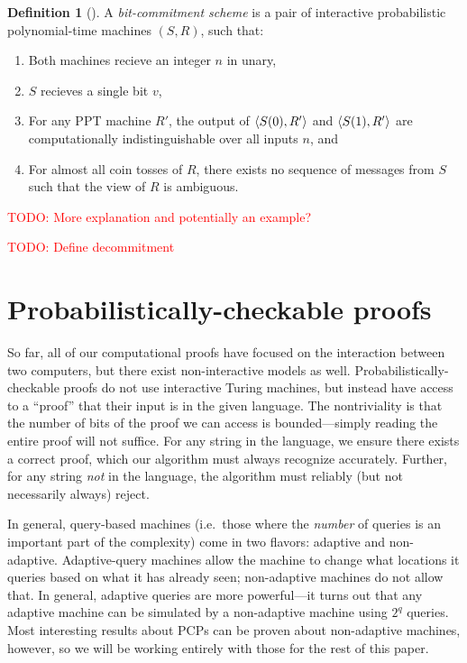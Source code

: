 \documentclass[english,12pt]{reedthesis}
\theoremstyle{plain}
\theoremstyle{definition}
\newtheorem{defn}[defn]{Definition}
\theoremstyle{remark}
\DeclarePairedDelimiter{\ang}{\langle}{\rangle}
\newcommand{\TODO}[1]{\textcolor{red}{TODO: #1}}
\begin{document}
\begin{defn}[{\cite[Def.\ 4.4.1]{Go01}}]\label{def:commitment-scheme}
  A \emph{bit-commitment scheme} is a pair of interactive probabilistic
  polynomial-time machines $(S, R)$, such that:
  \begin{enumerate}
    \item Both machines recieve an integer $n$ in unary,
    \item $S$ recieves a single bit $v$,
    \item For any PPT machine $R'$, the output of $\ang{S(0), R'}$ and
          $\ang{S(1), R'}$ are computationally indistinguishable over all inputs
          $n$, and
    \item For almost all coin tosses of $R$, there exists no sequence of
          messages from $S$ such that the view of $R$ is ambiguous.
  \end{enumerate}
\end{defn}

\TODO{More explanation and potentially an example?}

\TODO{Define decommitment}

\section{Probabilistically-checkable proofs}\label{sec:pcp}

So far, all of our computational proofs have focused on the interaction between
two computers, but there exist non-interactive models as well.
Probabilistically-checkable proofs do not use interactive Turing machines, but
instead have access to a ``proof'' that their input is in the given language.
The nontriviality is that the number of bits of the proof we can access is
bounded---simply reading the entire proof will not suffice. For any string in the
language, we ensure there exists a correct proof, which our algorithm must
always recognize accurately. Further, for any string \emph{not} in the language,
the algorithm must reliably (but not necessarily always) reject.

In general, query-based machines (i.e.\ those where the \emph{number} of queries
is an important part of the complexity) come in two flavors: adaptive and
non-adaptive. Adaptive-query machines allow the machine to change what locations
it queries based on what it has already seen; non-adaptive machines do not allow
that. In general, adaptive queries are more powerful---it turns out that any
adaptive machine can be simulated by a non-adaptive machine using $2^{q}$
queries. Most interesting results about PCPs can be proven about non-adaptive
machines, however, so we will be working entirely with those for the rest of
this paper.
\end{document}
